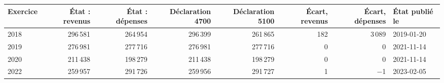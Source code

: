 \begin{tabular}{@{}lrrrrrrl@{}}\toprule
Exercice & État : revenus & État : dépenses & Déclaration 4700 & Déclaration 5100 & Écart, revenus & Écart, dépenses & État publié le \\\midrule
2018 & 296\,581 & 264\,954 & 296\,399 & 261\,865 & 182 & 3\,089 & 2019-01-20 \\
2019 & 276\,981 & 277\,716 & 276\,981 & 277\,716 & 0 & 0 & 2021-11-14 \\
2020 & 211\,438 & 198\,279 & 211\,438 & 198\,279 & 0 & 0 & 2021-11-14 \\
2022 & 259\,957 & 291\,726 & 259\,956 & 291\,727 & 1 & $-$1 & 2023-02-05 \\
\bottomrule\end{tabular}
